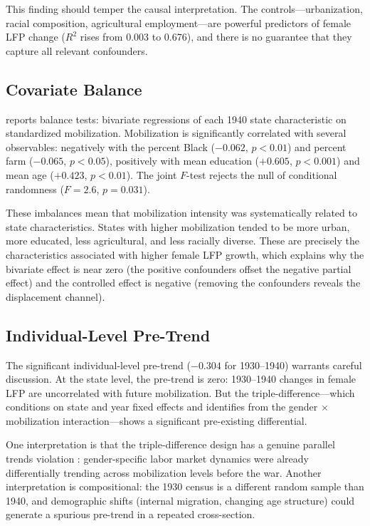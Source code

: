 \documentclass[12pt]{article}
\begin{document}
This finding should temper the causal interpretation. The controls---urbanization, racial composition, agricultural employment---are powerful predictors of female LFP change ($R^2$ rises from 0.003 to 0.676), and there is no guarantee that they capture all relevant confounders.



\subsection{Covariate Balance}

 reports balance tests: bivariate regressions of each 1940 state characteristic on standardized mobilization. Mobilization is significantly correlated with several observables: negatively with the percent Black ($-0.062$, $p < 0.01$) and percent farm ($-0.065$, $p < 0.05$), positively with mean education ($+0.605$, $p < 0.001$) and mean age ($+0.423$, $p < 0.01$). The joint $F$-test rejects the null of conditional randomness ($F = 2.6$, $p = 0.031$).

These imbalances mean that mobilization intensity was systematically related to state characteristics. States with higher mobilization tended to be more urban, more educated, less agricultural, and less racially diverse. These are precisely the characteristics associated with higher female LFP growth, which explains why the bivariate effect is near zero (the positive confounders offset the negative partial effect) and the controlled effect is negative (removing the confounders reveals the displacement channel).



\subsection{Individual-Level Pre-Trend}

The significant individual-level pre-trend ($-0.304$ for 1930--1940) warrants careful discussion. At the state level, the pre-trend is zero: 1930--1940 changes in female LFP are uncorrelated with future mobilization. But the triple-difference---which conditions on state and year fixed effects and identifies from the gender $\times$ mobilization interaction---shows a significant pre-existing differential.

One interpretation is that the triple-difference design has a genuine parallel trends violation \citep{rambachan2023more}: gender-specific labor market dynamics were already differentially trending across mobilization levels before the war. Another interpretation is compositional: the 1930 census is a different random sample than 1940, and demographic shifts (internal migration, changing age structure) could generate a spurious pre-trend in a repeated cross-section.
\end{document}
